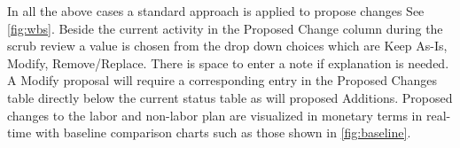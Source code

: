 In all the above cases a standard approach is applied to propose changes See \autoref{fig:wbs}. Beside the current activity in the Proposed Change column during the scrub review a value is chosen from the drop down choices which are Keep As-Is, Modify, Remove/Replace. There is space to enter a note if explanation is needed.
A Modify proposal will require a corresponding entry in the Proposed Changes table directly below the current status table as will proposed Additions.
Proposed changes to the labor and non-labor plan are visualized in monetary terms in real-time with baseline comparison charts such as those shown in \autoref{fig:baseline}.



\begin{figure}
\end{figure}

\begin{figure}
\end{figure}

